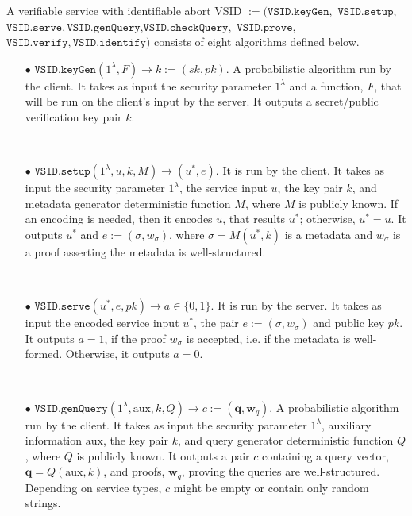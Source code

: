 \begin{definition}\label{service-def} A verifiable service with identifiable abort  VSID $:=(\mathtt{VSID.keyGen}, $ $\mathtt{VSID.setup}, $ $\mathtt{VSID.serve},\mathtt{VSID.genQuery}$,$\mathtt{VSID.checkQuery},$ $\mathtt{VSID.prove},$ $\mathtt{VSID.verify}, \mathtt{VSID.identify})$ consists of eight algorithms defined below.


\begin{itemize}
\item[$\bullet$] $\mathtt{VSID.keyGen}(1^{\lambda},F)\rightarrow k:=(sk,pk)$.  A probabilistic algorithm run by the client. It takes as input the security parameter $1^{\lambda}$ and a function, $F$, that will be run on the client's input by the server. It outputs a secret/public verification key pair $k$. 

\

\item[$\bullet$] $\mathtt{VSID.setup}(1^{\lambda}, u,k,M)\rightarrow (u^{\scriptscriptstyle *},e)$. It is run by the client. It takes as input the security parameter $1^{\lambda}$,  the service  input $u$,  the key pair $k$, and metadata generator deterministic function $M$, where $M$ is publicly known. If an encoding is needed, then it encodes $u$, that results $u^{\scriptscriptstyle *}$; otherwise, $u^{\scriptscriptstyle *}=u$. It outputs  $u^{\scriptscriptstyle *}$ and $e:=(\sigma,w_{\sigma})$, where $\sigma=M(u^{\scriptscriptstyle *},k)$ is a metadata and $w_{\sigma}$ is a proof asserting the metadata is well-structured.  

\

\item[$\bullet$] $\mathtt{VSID.serve}(u^{\scriptscriptstyle *},e,pk)\rightarrow a\in\{0,1\}$. It is run by the server. It takes as input the encoded service input $u^{\scriptscriptstyle *}$, the pair $e:=(\sigma,w_{\sigma})$ and public key $pk$. It outputs $a=1$, if the proof $w_{\sigma}$ is accepted, i.e. if the metadata is well-formed. Otherwise, it outputs $a=0$. 

\

\item[$\bullet$] $\mathtt{VSID.genQuery}(1^{\lambda},  \text{aux},k,Q)\rightarrow c:=(\bm{q},\bm{w}_{\scriptscriptstyle q})$. A probabilistic algorithm run by the client. It takes as input the security parameter $1^{\lambda}$, auxiliary information $ \text{aux}$,  the key pair $k$, and   query generator deterministic function $Q$, where $Q$ is publicly known. It outputs a pair $c$ containing a query vector, $\bm{q}=Q( \text{aux},k)$,  and proofs, $\bm{w}_{\scriptscriptstyle q}$, proving the queries are well-structured. Depending on service types, $c$ might be  empty or  contain only random strings.


\end{itemize}
\end{definition}
